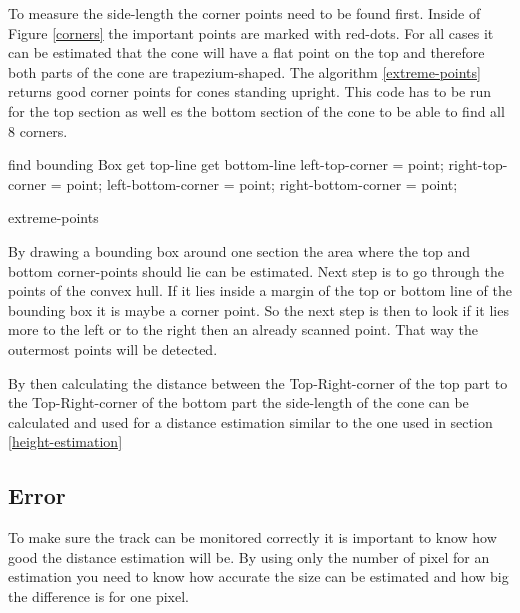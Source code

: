 \documentclass[10pt,a4paper]{article}
\begin{document}
	To measure the side-length the corner points need to be found first. Inside of Figure \ref{corners} the important points are marked with red-dots.
	For all cases it can be estimated that the cone will have a flat point on the top and therefore both parts of the cone are trapezium-shaped.
	The algorithm \ref{extreme-points} returns good corner points for cones standing upright. This code has to be run for the top section as well es the bottom section of the cone to be able to find all 8 corners.

	\begin{algorithm}
		find bounding Box\;
		get top-line\; 
		get bottom-line\;
			{
				{
					{left-top-corner = point;}
					{right-top-corner = point;}
				}
				{
					{left-bottom-corner = point;}
					{right-bottom-corner = point;}
			}
		}
	\label{extreme-points}
	\caption{extreme-points} 
	\end{algorithm}

	 
	By drawing a bounding box around one section the area where the top and bottom corner-points should lie can be estimated. Next step is to go through the points of the convex hull. If it lies inside a margin of the top or bottom line of the bounding box it is maybe a corner point. So the next step is then to look if it lies more to the left or to the right then an already scanned point. That way the outermost points will be detected.
	 
	By then calculating the distance between the Top-Right-corner of the top part to the Top-Right-corner of the bottom part the side-length of the cone can be calculated and used for a distance estimation similar to the one used in section \ref{height-estimation}
	
	
	\subsection{Error}
	To make sure the track can be monitored correctly it is important to know how good the distance estimation will be. By using only the number of pixel for an estimation you need to know how accurate the size can be estimated and how big the difference is for one pixel.
	
\end{document}
